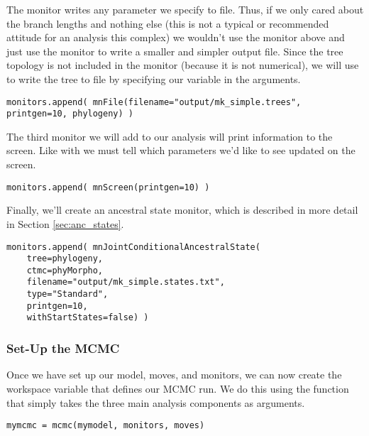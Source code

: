 The  monitor writes any parameter we specify to file.
Thus, if we only cared about the branch lengths and nothing else (this is not a typical or recommended attitude for an analysis this complex) we wouldn't use the  monitor above and just use the  monitor to write a smaller and simpler output file.
Since the tree topology is not included in the  monitor (because it is not numerical), we will use  to write the tree to file by specifying our  variable in the arguments.
{\tt \begin{snugshade*}
\begin{lstlisting}
monitors.append( mnFile(filename="output/mk_simple.trees", printgen=10, phylogeny) )
\end{lstlisting}
\end{snugshade*}}

The third monitor we will add to our analysis will print information to the screen.
Like with  we must tell  which parameters we'd like to see updated on the screen. 
{\tt \begin{snugshade*}
\begin{lstlisting}
monitors.append( mnScreen(printgen=10) )
\end{lstlisting}
\end{snugshade*}}

Finally, we'll create an ancestral state monitor, which is described in more detail in Section \ref{sec:anc_states}.
{\tt \begin{snugshade*}
\begin{lstlisting}
monitors.append( mnJointConditionalAncestralState(
    tree=phylogeny,
    ctmc=phyMorpho,
    filename="output/mk_simple.states.txt",
    type="Standard",
    printgen=10,
    withStartStates=false) )
\end{lstlisting}
\end{snugshade*}}


\medskip
\subsubsection{Set-Up the MCMC}

Once we have set up our model, moves, and monitors, we can now create the workspace variable that defines our MCMC run. 
We do this using the  function that simply takes the three main analysis components as arguments.
{\tt \begin{snugshade*}
\begin{lstlisting}
mymcmc = mcmc(mymodel, monitors, moves)\end{lstlisting}
\end{snugshade*}}

